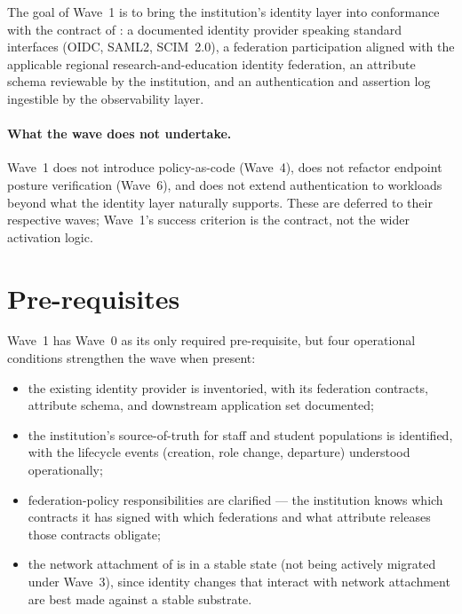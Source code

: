 The goal of Wave~1 is to bring the institution's identity layer
into conformance with the contract of : a
documented identity provider speaking standard interfaces (OIDC,
SAML2, SCIM~2.0), a federation participation aligned with the
applicable regional research-and-education identity federation,
an attribute schema reviewable by
the institution, and an authentication and assertion log
ingestible by the observability layer.

\paragraph{What the wave does not undertake.} Wave~1 does not
introduce policy-as-code (Wave~4), does not refactor endpoint
posture verification (Wave~6), and does not extend authentication
to workloads beyond what the identity layer naturally supports.
These are deferred to their respective waves; Wave~1's success
criterion is the contract, not the wider activation logic.

\section{Pre-requisites}
\label{sec:w1-prereq}

Wave~1 has Wave~0 as its only required pre-requisite, but four
operational conditions strengthen the wave when present:

\begin{itemize}[leftmargin=1.5em,nosep]
  \item the existing identity provider is inventoried, with its
    federation contracts, attribute schema, and downstream
    application set documented;
  \item the institution's source-of-truth for staff and student
    populations is identified, with the lifecycle events
    (creation, role change, departure) understood operationally;
  \item federation-policy responsibilities are clarified --- the
    institution knows which contracts it has signed with which
    federations and what attribute releases those contracts
    obligate;
  \item the network attachment of  is in a
    stable state (not being actively migrated under Wave~3),
    since identity changes that interact with network attachment
    are best made against a stable substrate.
\end{itemize}

